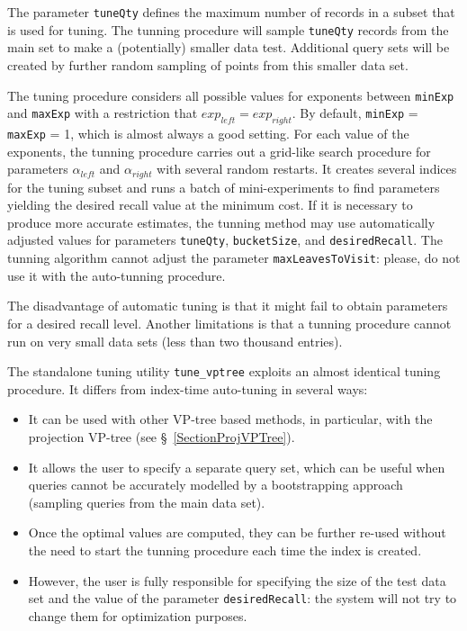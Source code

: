 \documentclass[runningheads,a4paper]{llncs}
\newcommand{\ttt}[1]{\texttt{#1}}
\begin{document}
{The parameter \texttt{tuneQty} defines the maximum number of records in a subset that is used for tuning. 
The tunning procedure will sample \texttt{tuneQty} records from the main set to make a (potentially) smaller data test. 
Additional query sets will be created by further random sampling of points from this smaller data set.

The tuning procedure considers all possible values for exponents between \ttt{minExp} and \ttt{maxExp} with 
a restriction that  $exp_{left}=exp_{right}$. 
By default, \ttt{minExp} = \ttt{maxExp} = 1, which is almost always a good setting.
For each value of the exponents,
the tunning procedure carries out a grid-like search procedure for parameters $\alpha_{left}$ and $\alpha_{right}$ 
with several random restarts. 
It creates several indices for the tuning subset and runs a batch of mini-experiments to
find parameters yielding the desired recall value at the minimum cost.
If it is necessary to produce more accurate estimates, the tunning method may use automatically adjusted
values for parameters \texttt{tuneQty}, \texttt{bucketSize}, and \texttt{desiredRecall}.
The tunning algorithm cannot adjust the parameter \texttt{maxLeavesToVisit}:
please, do not use it with the auto-tunning procedure.

The disadvantage of automatic tuning is that it might fail to obtain
parameters for a desired recall level. Another limitations is that a tunning procedure cannot
run on very small data sets (less than two thousand entries).

The standalone tuning utility \texttt{tune\_vptree} exploits an almost identical tuning procedure.
It differs from index-time auto-tuning in several ways:  
\begin{itemize}
\item  It can be used with other VP-tree based methods, 
in particular, with the projection VP-tree (see \S~\ref{SectionProjVPTree}).
\item It allows the user to specify a separate query set, which can be useful
when queries cannot be accurately modelled by a bootstrapping approach (sampling queries from the main data set).
\item Once the optimal values are computed, they can be further re-used without the need
to start the tunning procedure each time the index is created.
\item However, the user is fully responsible for specifying the size of the test data set
and the value of the parameter \texttt{desiredRecall}: the system
will not try to change them for optimization purposes.
\end{itemize}

}
\end{document}
